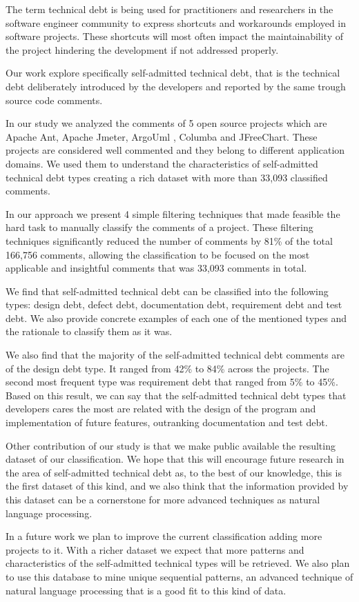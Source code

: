 The term technical debt is being used for practitioners and researchers in the software engineer community to express shortcuts and workarounds employed in software projects. These shortcuts will most often impact the maintainability of the project hindering the development if not addressed properly.

Our work explore specifically self-admitted technical debt, that is the technical debt deliberately introduced by the developers and reported by the same trough source code comments.

In our study we analyzed the comments of 5 open source projects which are Apache Ant, Apache Jmeter, ArgoUml , Columba and JFreeChart. These projects are considered well commented and they belong to different application domains. We used them to understand the characteristics of self-admitted technical debt types creating a rich dataset with more than 33,093 classified comments.

In our approach we present 4 simple filtering techniques that made feasible the hard task to manually classify the comments of a project. These filtering techniques significantly reduced the number of comments by 81\% of the total 166,756 comments, allowing the classification to be focused on the most applicable and insightful comments that was 33,093 comments in total. 

We find that self-admitted technical debt can be classified into the following types: design debt, defect debt, documentation debt, requirement debt and test debt. We also provide concrete examples of each one of the mentioned types and the rationale to classify them as it was.  

We also find that the majority of the self-admitted technical debt comments are of the design debt type. It ranged from 42\% to 84\% across the projects. The second most frequent type was requirement debt that ranged from 5\% to 45\%. Based on this result, we can say that the self-admitted technical debt types that developers cares the most are related with the design of the program and implementation of future features, outranking documentation and test debt.

Other contribution of our study is that we make public available the resulting dataset of our classification. We hope that this will encourage future research in the area of self-admitted technical debt as, to the best of our knowledge, this is the first dataset of this kind, and we also think that the information provided by this dataset can be a cornerstone for more advanced techniques as natural language processing.   

In a future work we plan to improve the current classification adding more projects to it. With a richer dataset we expect that more patterns and characteristics of the self-admitted technical types will be retrieved. We also plan to use this database to mine unique sequential patterns, an advanced technique of natural language processing that is a good fit to this kind of data. 
